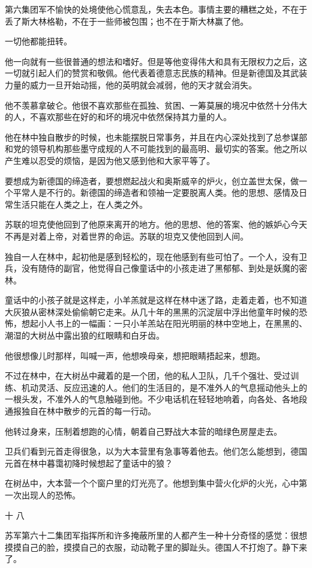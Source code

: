 第六集团军不愉快的处境使他心慌意乱，失去本色。事情主要的糟糕之处，不在于丢了斯大林格勒，不在于一些师被包围；也不在于斯大林赢了他。

一切他都能扭转。

他一向就有一些很普通的想法和嗜好。但是等他变得伟大和具有无限权力之后，这一切就引起人们的赞赏和敬佩。他代表着德意志民族的精神。但是新德国及其武装力量的威力一旦开始动摇，他的英明就会减弱，他的天才就会消失。

他不羡慕拿破仑。他很不喜欢那些在孤独、贫困、一筹莫展的境况中依然十分伟大的人，不喜欢那些在好的和坏的境况中依然保持其力量的人。

他在林中独自散步的时候，也未能摆脱日常事务，并且在内心深处找到了总参谋部和党的领导机构那些墨守成规的人不可能找到的最高明、最切实的答案。他之所以产生难以忍受的烦恼，是因为他又感到他和大家平等了。

要想成为新德国的缔造者，要想燃起战火和奥斯威辛的炉火，创立盖世太保，做一个平常人是不行的。新德国的缔造者和领袖一定要脱离人类。他的思想、感情及日常生活只能在人类之上，在人类之外。

苏联的坦克使他回到了他原来离开的地方。他的思想、他的答案、他的嫉妒心今天不再是对着上帝，对着世界的命运。苏联的坦克又使他回到人间。

独自一人在林中，起初他是感到轻松的，现在他感到有些可怕了。一个人，没有卫兵，没有随侍的副官，他觉得自己像童话中的小孩走进了黑郁郁、到处是妖魔的密林。

童话中的小孩子就是这样走，小羊羔就是这样在林中迷了路，走着走着，也不知道大灰狼从密林深处偷偷朝它走来。从几十年的黑黑的沉淀层中浮出他童年时候的恐怖，想起小人书上的一幅画：一只小羊羔站在阳光明丽的林中空地上，在黑黑的、潮湿的大树丛中露出狼的红眼睛和白牙齿。

他很想像儿时那样，叫喊一声，他想唤母亲，想把眼睛捂起来，想跑。

不过在林中，在大树丛中藏着的是一个团，他的私人卫队，几千个强壮、受过训练、机动灵活、反应迅速的人。他们的生活目的，是不准外人的气息摇动他头上的一根头发，不准外人的气息触碰到他。不少电话机在轻轻地响着，向各处、各地段通报独自在林中散步的元首的每一行动。

他转过身来，压制着想跑的心情，朝着自己野战大本营的暗绿色房屋走去。

卫兵们看到元首走得很急，以为大本营里有急事等着他去。他们怎么能想到，德国元首在林中暮霭初降时候想起了童话中的狼？

在树丛中，大本营一个个窗户里的灯光亮了。他想到集中营火化炉的火光，心中第一次出现人的恐怖。

十 八

苏军第六十二集团军指挥所和许多掩蔽所里的人都产生一种十分奇怪的感觉：很想摸摸自己的脸，摸摸自己的衣服，动动靴子里的脚趾头。德国人不打炮了。静下来了。

